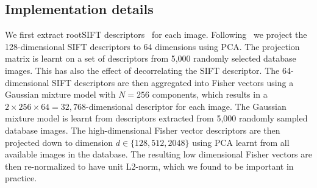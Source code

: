 \documentclass[table]{article} %
\begin{document}
   \subsection{Implementation details}
      We first extract rootSIFT descriptors~\cite{Arandjelovic12} for each image. %
	Following~\cite{Jegou12} we project the 128-dimensional SIFT descriptors to 64 dimensions using PCA. The projection matrix
	is learnt on a set of descriptors from 5,000 randomly selected database images. This has also the effect of decorrelating the SIFT descriptor. 
        The 64-dimensional SIFT descriptors are then aggregated into Fisher vectors using a Gaussian mixture model with $N=256$ components, which 
        results in a $2\times256\times64 = 32,768$-dimensional descriptor for each image.  
        The Gaussian mixture model is learnt from descriptors extracted from 5,000 randomly sampled database images. 
        The  high-dimensional Fisher vector descriptors are then projected down to dimension $d\in\{128,512, 2048\}$ using PCA learnt
        from all available images in the database. 
        The resulting low dimensional Fisher vectors are then re-normalized to have unit L2-norm, which we found to be important in practice. 

\end{document}
